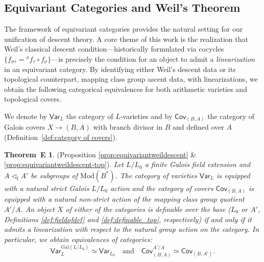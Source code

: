 \documentclass[10pt]{amsart}
\theoremstyle{definition}
\newtheorem*{thmE}{Theorem~E}
\newcommand{\Gal}{{ \mathrm{Gal}}}
\begin{document}
\subsection*{Equivariant Categories and Weil's Theorem}
The framework of equivariant categories provides the natural setting for our unification of descent theory. 
A core theme of this work is the realization that Weil's classical descent condition—historically formulated via cocycles $\{ f_{\sigma \tau} = {^\sigma \! f_\tau} \circ f_\sigma \}$—is precisely the condition for an object to admit a \textit{linearization} in an equivariant category. 
By identifying either Weil's descent data or its topological counterpart, mapping class group ascent data, with linearizations, we obtain the following categorical equivalences for both arithmetic varieties and topological covers. 

We denote by $\mathsf{Var}_L$ the category of $L$-varieties and by $\mathsf{Cov}_{(B,A)}$ the category of Galois covers $X\to(B,A)$ with branch divisor in $B$ and defined over $A$ (Definition~\ref{def:category of covers}). 

\begin{thmE} (Proposition \ref{prop:equivariantweildescent} \& \ref{prop:equivariantweildescent-top}).
\textit{Let $L/L_0$ a finite Galois field extension and $A \lhd_{\mathrm{f}} A'$ be subgroups of $\mathrm{Mod}(B^*)$. 
The category of varieties $\mathsf{Var}_L$ is equipped with a natural strict Galois $L/L_0$ action and the category of covers $\mathsf{Cov}_{(B,A)}$ is equipped with a natural non-strict action of the mapping class group quotient $A'/A$. An object $X$ of either of the categories is definable over the base ($L_0$ or $A'$, Definitions \ref{def:fieldofdef} and \ref{def:definable_top}, respectively) if and only if it admits a linearization with respect to the natural group action on the category. In particular, we obtain equivalences of categories:
\[
\mathsf{Var}_L^{\Gal(L/L_0)} \simeq \mathsf{Var}_{L_0} \quad \text{and} \quad \mathsf{Cov}_{(B,A)}^{A'/A} \simeq \mathsf{Cov}_{(B,A')}.
\]}
\end{thmE}
\end{document}
